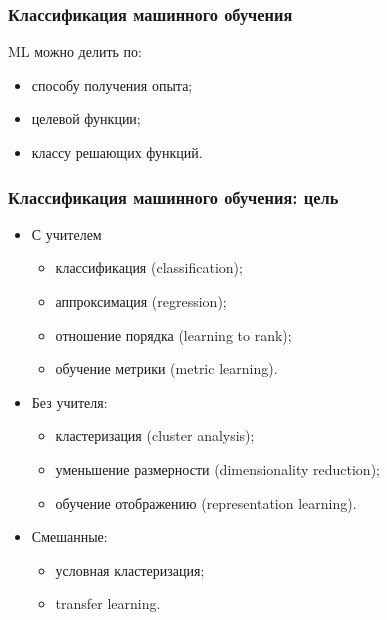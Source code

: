 \documentclass[14pt, fleqn, xcolor={dvipsnames, table}]{beamer}
\begin{document}
\begin{frame}
\frametitle{Классификация машинного обучения}
ML можно делить по:
\begin{itemize}
	\item способу получения опыта;
	\item { целевой функции;}
	\item классу решающих функций.
\end{itemize}
\end{frame}

\begin{frame}
\frametitle{Классификация машинного обучения: цель}
\begin{itemize}
	\item С учителем
	\begin{itemize}
		\item классификация (classification);
		\item аппроксимация (regression);
		\item отношение порядка (learning to rank);
		\item обучение метрики (metric learning).
	\end{itemize}
	\item Без учителя:
	\begin{itemize}
		\item кластеризация (cluster analysis);
		\item уменьшение размерности (dimensionality reduction);
		\item обучение отображению (representation learning).
	\end{itemize}
	\item Смешанные:
	\begin{itemize}
		\item условная кластеризация;
		\item transfer learning.
	\end{itemize}
\end{itemize}
\end{frame}
\end{document}
